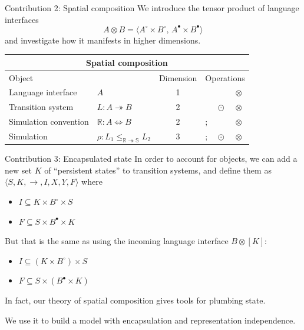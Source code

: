 \documentclass[aspectratio=1610,12pt]{beamer}
\newcommand{\que}{\circ}
\newcommand{\ans}{\bullet}
\begin{document}
\begin{frame}{Contribution 2: Spatial composition} %
  We introduce the tensor product of language interfaces
  \[
    A \otimes B = \langle A^\circ \times B^\circ, \, A^\bullet \times B^\bullet \rangle
  \]
  and investigate how it manifests in higher dimensions.

  \vfill
  \begin{center}
    \begin{tabular}{llclll}
      \toprule
      \multicolumn{6}{c}{\textbf{Spatial composition}} \\
      \midrule
      Object & & Dimension & \multicolumn{3}{c}{Operations} \\
      \midrule
      Language interface & $A$ & 1 & & & $\otimes$ \\
      Transition system & $L : A \twoheadrightarrow B$ & 2 & & $\odot$ & $\otimes$ \\
      Simulation convention & $\mathbb{R} : A \Leftrightarrow B$ & 2 & $\mathbin;$ & & $\otimes$ \\
      Simulation & $\rho : L_1 \le_{\mathbb{R} \twoheadrightarrow \mathbb{S}} L_2$ & 3 & $\mathbin;$ & $\odot$ & $\otimes$ \\
      \bottomrule
    \end{tabular}
  \end{center}
\end{frame}

\begin{frame}{Contribution 3: Encapsulated state} %
In order to account for objects,
we can add a new set $K$ of ``persistent states''
to transition systems,
and define them as
$\langle S, K, {\rightarrow}, I, X, Y, F \rangle$ where
\begin{itemize}
  \item $I \subseteq K \times B^\que \times S$
  \item $F \subseteq S \times B^\ans \times K$
\end{itemize}

\vfill
But that is the same as using the incoming language interface $B \otimes [K]$:
\begin{itemize}
  \item $I \subseteq (K \times B^\que) \times S$
  \item $F \subseteq S \times (B^\ans \times K)$
\end{itemize}

\vfill
In fact, our theory of spatial composition
gives tools for plumbing state.

We use it to build a model with
encapsulation and representation independence.
\end{frame}
  
\end{document}
